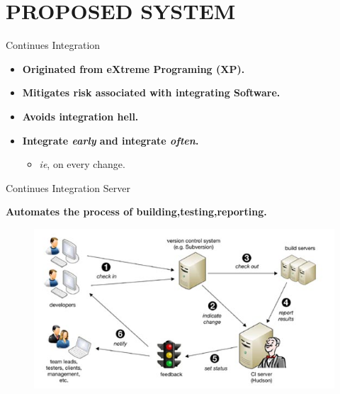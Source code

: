 \documentclass{beamer}
\begin{document}
\section{PROPOSED SYSTEM}  

\begin{frame}{Continues Integration}
\vspace{0.5cm}
 \begin{itemize}
\item \textbf{Originated from eXtreme Programing (XP).}
\vspace{.5 cm}
\item \textbf{Mitigates risk associated with integrating Software.} 
\vspace{.5 cm}
\item\textbf{Avoids integration hell.}

\vspace{.5 cm}
\item \textbf{Integrate \textit{early} and integrate \textit{often}.}
\vspace{.5 cm}
 \begin{itemize}
\item \textit{ie}, on every change.
\end{itemize}
\end{itemize}
\end{frame}  

\begin{frame}{Continues Integration Server}

 \textbf {Automates the process of building,testing,reporting.}
\begin{figure}
\begin{center}
\includegraphics[scale=2.5]{hudson1.jpg}
\end{center}
\end{figure}
\end{frame}
\end{document}
